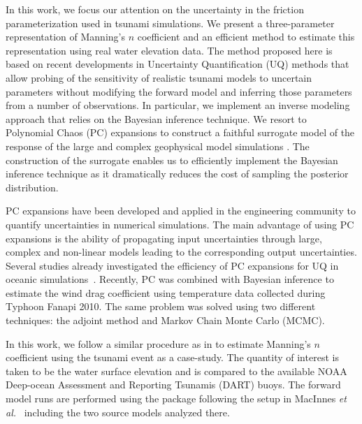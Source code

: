 In this work, we focus our attention on the uncertainty in the friction
parameterization used in tsunami simulations. We present a three-parameter 
representation of Manning's $n$ coefficient and an efficient method
to estimate this representation using real water elevation data. The method proposed here 
is based on recent developments in Uncertainty Quantification (UQ) methods that allow 
probing of the sensitivity of realistic tsunami  models to uncertain parameters
without modifying the forward model and inferring those parameters
from a number of observations.  In particular, we implement an inverse modeling
approach that relies on the Bayesian inference technique.  We resort to
Polynomial Chaos (PC) expansions to construct a faithful surrogate model of the
response of the large and complex geophysical model simulations \cite{Najm:2009,Alexanderian2012,sraj:2013a,sraj:2013b}. The construction of the surrogate enables us to efficiently implement the Bayesian
inference technique as it dramatically reduces the cost of sampling the
posterior distribution.

PC expansions have been developed and applied in the engineering community to
quantify uncertainties in numerical simulations.  The main advantage of
using PC expansions is the ability of propagating input uncertainties through 
large, complex and non-linear models leading to the corresponding output uncertainties. 
Several studies already investigated the efficiency of PC expansions for 
UQ in oceanic simulations~\citep{thacker2012,ashwanth2010,Alexanderian2012}. 
Recently, PC was combined with Bayesian inference to estimate the wind drag coefficient 
using temperature data collected during Typhoon Fanapi 2010. The same problem was 
solved using two different techniques: the adjoint method and Markov Chain Monte Carlo
(MCMC)\cite{sraj:2013a,sraj:2013b}.

In this work, we follow a similar procedure as in \cite{sraj:2013a,sraj:2013b}
to estimate Manning's $n$ coefficient using the \tohoku tsunami
event as a case-study. The quantity of interest is taken to be the water surface
elevation and is compared to the available NOAA Deep-ocean Assessment and
Reporting Tsunamis (DART) buoys.  The forward model runs are performed using the
\geoclaw package following the setup in MacInnes \emph{et al.}~\cite{MacInnes:2013cr} 
including the two source models analyzed there.

